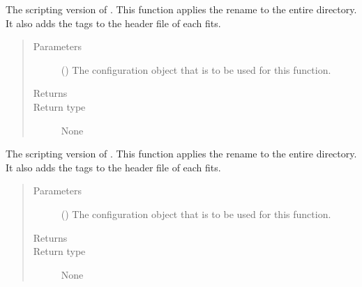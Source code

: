 \documentclass[letterpaper,10pt,english]{sphinxmanual}
\begin{document}
\begin{fulllineitems}
\label{\detokenize{docstrings/ifa_smeargle.reformat.renaming:ifa_smeargle.reformat.renaming.script_rename_garbage}}
The scripting version of . This function
applies the rename to the entire directory. It also adds the
tags to the header file of each fits.
\begin{quote}\begin{description}
\item[{Parameters}] \leavevmode
{} () \textendash{} The configuration object that is to be used for this
function.

\item[{Returns}] \leavevmode


\item[{Return type}] \leavevmode
None

\end{description}\end{quote}

\end{fulllineitems}


\begin{fulllineitems}
\label{\detokenize{docstrings/ifa_smeargle.reformat.renaming:ifa_smeargle.reformat.renaming.script_rename_number}}
The scripting version of . This function
applies the rename to the entire directory. It also adds the
tags to the header file of each fits.
\begin{quote}\begin{description}
\item[{Parameters}] \leavevmode
{} () \textendash{} The configuration object that is to be used for this
function.

\item[{Returns}] \leavevmode


\item[{Return type}] \leavevmode
None

\end{description}\end{quote}

\end{fulllineitems}
\end{document}
